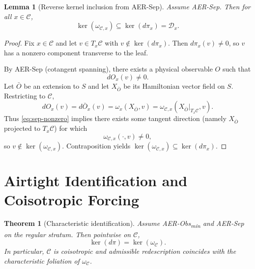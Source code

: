 \documentclass[11pt]{article}
\newtheorem{lemma}[definition]{Lemma}
\newtheorem{theorem}[definition]{Theorem}
\theoremstyle{remark}
\theoremstyle{plain}
\begin{document}
\begin{lemma}[Reverse kernel inclusion from AER-Sep]
\label{lem:incl2}
Assume AER-Sep. Then for all $x\in\mathcal{C}$,
\begin{equation}
\ker(\omega_{\mathcal{C},x})\subseteq \ker(d\pi_x)=\mathcal{D}_x.
\end{equation}
\end{lemma}

\begin{proof}
Fix $x\in\mathcal{C}$ and let $v\in T_x\mathcal{C}$ with $v\notin\ker(d\pi_x)$. Then $d\pi_x(v)\neq 0$, so $v$ has a nonzero component transverse to the leaf.

By AER-Sep (cotangent spanning), there exists a physical observable $O$ such that
\begin{equation}
dO_x(v)\neq 0.
\label{eq:sep-nonzero}
\end{equation}
Let $\bar O$ be an extension to $S$ and let $X_{\bar O}$ be its Hamiltonian vector field on $S$.
Restricting to $\mathcal{C}$,
\begin{equation}
dO_x(v)=d\bar O_x(v)=\omega_x(X_{\bar O},v)=\omega_{\mathcal{C},x}(X_{\bar O}|_{T_x\mathcal{C}},v).
\end{equation}
Thus \eqref{eq:sep-nonzero} implies there exists some tangent direction (namely $X_{\bar O}$ projected to $T_x\mathcal{C}$) for which
\begin{equation}
\omega_{\mathcal{C},x}(\cdot,v)\neq 0,
\end{equation}
so $v\notin\ker(\omega_{\mathcal{C},x})$.
Contraposition yields $\ker(\omega_{\mathcal{C},x})\subseteq\ker(d\pi_x)$.
\end{proof}

\section{Airtight Identification and Coisotropic Forcing}

\begin{theorem}[Characteristic identification]
\label{thm:char}
Assume AER-Obs\textsubscript{min} and AER-Sep on the regular stratum. Then pointwise on $\mathcal{C}$,
\begin{equation}
\ker(d\pi)=\ker(\omega_{\mathcal{C}}).
\end{equation}
In particular, $\mathcal{C}$ is coisotropic and admissible redescription coincides with the characteristic foliation of $\omega_{\mathcal{C}}$.
\end{theorem}
\end{document}
